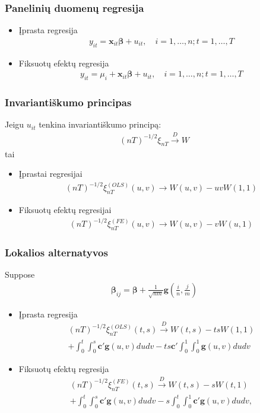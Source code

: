 \documentclass[utf8,hyperref={unicode}]{beamer}
\theoremstyle{change}\newtheorem{teorema}{Teiginys}
\theoremstyle{change}\newtheorem{salyga}{}
\newcommand{\bb}{\bm{\beta}}
\newcommand{\bx}{\mathbf{x}}
\begin{document}
\begin{frame}
    \frametitle{Panelinių duomenų regresija} 
    \begin{itemize}
	\item Įprasta regresija
	    \begin{align*}
		y_{it}=\bx_{it}\bb+u_{it},\quad i=1,\dots,n; t=1,\dots,T
	    \end{align*}
	\item Fiksuotų efektų regresija
	    \begin{align*}
		y_{it}=\mu_i+\bx_{it}\bb+u_{it},\quad i=1,\dots,n; t=1,\dots,T
	    \end{align*}
    \end{itemize}
\end{frame}
\begin{frame}
    \frametitle{Invariantiškumo principas} 
	Jeigu $u_{it}$ tenkina invariantiškumo principą:
	    \begin{align*}
		(nT)^{-1/2}\xi_{nT}\xrightarrow{D} W
	    \end{align*}
	    tai

    \begin{itemize}
	\item Įprastai regresijai
	    \begin{align*}
		(nT)^{-1/2}\xi_{nT}^{(OLS)}(u,v) \to W(u,v)-uvW(1,1)
	    \end{align*}
	\item Fiksuotų efektų regresijai
	    \begin{align*}
		(nT)^{-1/2}\xi_{nT}^{(FE)}(u,v) \to W(u,v)-vW(u,1)
	    \end{align*}

    \end{itemize}
\end{frame}
\begin{frame}
    \frametitle{Lokalios alternatyvos} 
Suppose 
	    \begin{align*}
			\bb_{ij}=\bb+\frac{1}{\sqrt{nm}}\bm{g}\left(\frac{i}{n},\frac{j}{m}\right)
	    \end{align*}

    \begin{itemize}
	\item Įprasta regresija
	    \begin{align*}
		(nT)^{-1/2}\xi_{nT}^{(OLS)}(t,s)\xrightarrow{D}
		W(t,s)-tsW(1,1)\\+
	\int_0^t\int_0^s\bm{c}'\bm{g}(u,v)dudv-ts\bm{c}'\int_0^1\int_0^1\bm{g}(u,v)dudv
	    \end{align*}
	\item Fiksuotų efektų regresija
	    \begin{align*}
	(nT)^{-1/2}\xi_{nT}^{(FE)}(t,s)\xrightarrow{D} W(t,s)-sW(t,1)\\+
	\int_0^t\int_0^s\bm{c}'\bm{g}(u,v)dudv-s\int_0^t\int_0^1\bm{c}'\bm{g}(u,v)dudv,
	    \end{align*}
    \end{itemize}
\end{frame}
\end{document}
